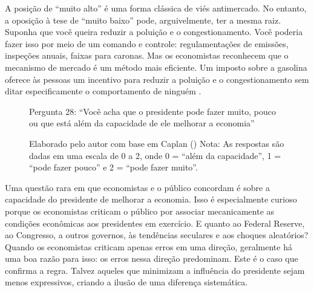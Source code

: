 A posição de “muito alto” é uma forma clássica de viés antimercado. No entanto, a oposição à tese de “muito baixo” pode, arguivelmente, ter a mesma raiz. Suponha que você queira reduzir a poluição e o congestionamento. Você poderia fazer isso por meio de um comando e controle: regulamentações de emissões, inspeções anuais, faixas para caronas. Mas os economistas reconhecem que o mecanismo de mercado é um método mais eficiente. Um imposto sobre a gasolina oferece às pessoas um incentivo para reduzir a poluição e o congestionamento sem ditar especificamente o comportamento de ninguém \cite{The_Myth_of_the_Rational_Voter,blinder1987hard}.


\begin{figure}[H]
    \centering
    \caption*{Pergunta 28: “Você acha que o presidente pode fazer muito, pouco ou que está além da capacidade de ele melhorar a economia”}
    \caption{Elaborado pelo autor com base em Caplan (\citeyear{The_Myth_of_the_Rational_Voter}) \newline
    Nota: As respostas são dadas em uma escala de 0 a 2, onde 0 = “além da capacidade”, 1 = “pode fazer pouco” e 2 = “pode fazer muito”.}
    \label{fig:pergunta_28}
\end{figure}

Uma questão rara em que economistas e o público concordam é sobre a capacidade do presidente de melhorar a economia. Isso é especialmente curioso porque os economistas criticam o público por associar mecanicamente as condições econômicas aos presidentes em exercício. E quanto ao Federal Reserve, ao Congresso, a outros governos, às tendências seculares e aos choques aleatórios? Quando os economistas criticam apenas erros em uma direção, geralmente há uma boa razão para isso: os erros nessa direção predominam. Este é o caso que confirma a regra. Talvez aqueles que minimizam a influência do presidente sejam menos expressivos, criando a ilusão de uma diferença sistemática.



